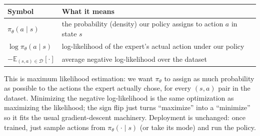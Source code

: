 \begin{center}
\begin{tabular}{@{}ll@{}}
\toprule
Symbol & What it means \\
\midrule
$\pi_\theta(a\mid s)$ & the probability (density) our policy assigns to action $a$ in state $s$ \\
$\log \pi_\theta(a\mid s)$ & log-likelihood of the expert's actual action under our policy \\
$-\mathbb{E}_{(s,a)\in\mathcal{D}}[\cdot]$ & average negative log-likelihood over the dataset \\
\bottomrule
\end{tabular}
\end{center}

This is maximum likelihood estimation: we want $\pi_\theta$ to assign as much probability as possible to the actions the expert actually chose, for every $(s,a)$ pair in the dataset. Minimizing the negative log-likelihood is the same optimization as maximizing the likelihood; the sign flip just turns ``maximize'' into a ``minimize'' so it fits the usual gradient-descent machinery. Deployment is unchanged: once trained, just sample actions from $\pi_\theta(\cdot \mid s)$ (or take its mode) and run the policy.
